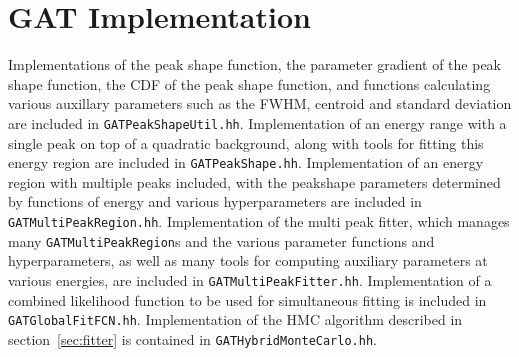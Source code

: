 \documentclass[/main.tex]{subfiles}
\begin{document}
\section{GAT Implementation}
Implementations of the peak shape function, the parameter gradient of the peak shape function, the CDF of the peak shape function, and functions calculating various auxillary parameters such as the FWHM, centroid and standard deviation are included in \texttt{GATPeakShapeUtil.hh}.
Implementation of an energy range with a single peak on top of a quadratic background, along with tools for fitting this energy region are included in \texttt{GATPeakShape.hh}.
Implementation of an energy region with multiple peaks included, with the peakshape parameters determined by functions of energy and various hyperparameters are included in \texttt{GATMultiPeakRegion.hh}.
Implementation of the multi peak fitter, which manages many \texttt{GATMultiPeakRegion}s and the various parameter functions and hyperparameters, as well as many tools for computing auxiliary parameters at various energies, are included in \texttt{GATMultiPeakFitter.hh}.
Implementation of a combined likelihood function to be used for simultaneous fitting is included in \texttt{GATGlobalFitFCN.hh}.
Implementation of the HMC algorithm described in section~\ref{sec:fitter} is contained in \texttt{GATHybridMonteCarlo.hh}.
\\

\onlyinsubfile{
  
  
}
\end{document}
